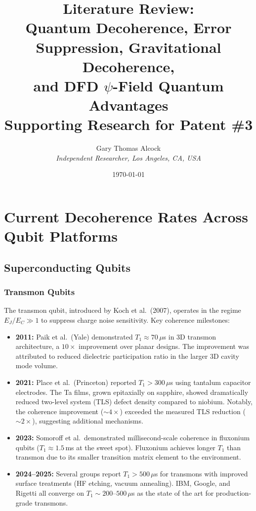 \documentclass[11pt,letterpaper]{article}
\title{Literature Review:\\
Quantum Decoherence, Error Suppression, Gravitational Decoherence,\\
and DFD $\psi$-Field Quantum Advantages\\[6pt]
\large Supporting Research for Patent \#3}
\author{Gary Thomas Alcock\\
\textit{Independent Researcher, Los Angeles, CA, USA}}
\date{\today}
\begin{document}
\maketitle
\tableofcontents
\newpage

\section{Current Decoherence Rates Across Qubit Platforms}

\subsection{Superconducting Qubits}

\subsubsection{Transmon Qubits}

The transmon qubit, introduced by Koch et al.\ (2007), operates in the
regime $E_J/E_C \gg 1$ to suppress charge noise sensitivity. Key
coherence milestones:

\begin{itemize}
\item \textbf{2011:} Paik et al.\ (Yale) demonstrated $T_1 \approx
70\,\mu$s in 3D transmon architecture, a $10\times$ improvement over
planar designs. The improvement was attributed to reduced dielectric
participation ratio in the larger 3D cavity mode volume.

\item \textbf{2021:} Place et al.\ (Princeton) reported $T_1 > 300\,\mu$s
using tantalum capacitor electrodes. The Ta films, grown epitaxially on
sapphire, showed dramatically reduced two-level system (TLS) defect
density compared to niobium. Notably, the coherence improvement
($\sim 4\times$) exceeded the measured TLS reduction ($\sim 2\times$),
suggesting additional mechanisms.

\item \textbf{2023:} Somoroff et al.\ demonstrated millisecond-scale
coherence in fluxonium qubits ($T_1 \approx 1.5$\,ms at the sweet spot).
Fluxonium achieves longer $T_1$ than transmon due to its smaller
transition matrix element to the environment.

\item \textbf{2024--2025:} Several groups report $T_1 > 500\,\mu$s for
transmons with improved surface treatments (HF etching, vacuum annealing).
IBM, Google, and Rigetti all converge on $T_1 \sim 200$--$500\,\mu$s as
the state of the art for production-grade transmons.
\end{itemize}
\end{document}
